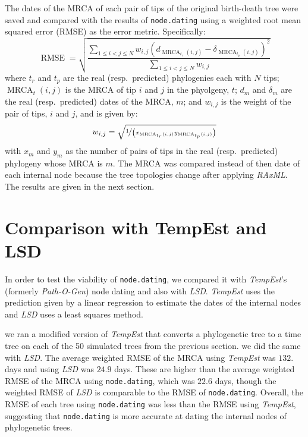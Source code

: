 \documentclass[12pt]{article}
\newcommand{\code}[1]{{\tt #1}}
\begin{document}
The dates of the MRCA of each pair of tips of the original birth-death tree were saved and compared with the results of \code{node.dating} using a weighted root mean squared error (RMSE) as the error metric.
Specifically:
\[\operatorname{RMSE} = \sqrt{\frac{\sum_{1 \leq i < j \leq N}w_{i,j}\left(d_{\operatorname{MRCA}_{t_r}(i,j)} - \delta_{\operatorname{MRCA}_{t_p}(i,j)}\right)^2}{\sum_{1 \leq i < j \leq N}w_{i,j}}}\]
where $t_r$ and $t_p$ are the real (resp.~predicted) phylogenies each with $N$ tips; $\operatorname{MRCA}_t(i, j)$ is the MRCA of tip $i$ and $j$ in the phyolgeny, $t$; $d_{m}$ and $\delta_m$ are the real (resp.~predicted) dates of the MRCA, $m$; and $w_{i, j}$ is the weight of the pair of tips, $i$ and $j$, and is given by:
\[w_{i, j} = \sqrt{\nicefrac{1}{\left(x_{\operatorname{MRCA}_{t_r}(i,j)}y_{\operatorname{MRCA}_{t_p}(i,j)}\right)}}\]
with $x_m$ and $y_m$ as the number of pairs of tips in the real (resp.~predicted) phylogeny whose MRCA is $m$.
The MRCA was compared instead of then date of each internal node because the tree topologies change after applying \emph{RAxML}. The results are given in the next section.

\section*{Comparison with TempEst and LSD} \label{sec:tempest}
In order to test the viability of \code{node.dating}, we compared it with \emph{TempEst}'s (formerly \emph{Path-O-Gen}) node dating and also with \emph{LSD}.
\emph{TempEst} uses the prediction given by a linear regression to estimate the dates of the internal nodes and \emph{LSD} uses a least squares method.

we ran a modified version of \emph{TempEst} that converts a phylogenetic tree to a time tree on each of the 50 simulated trees from the previous section.
we did the same with \emph{LSD}.
The average weighted RMSE of the MRCA using \emph{TempEst} was $132.$ days and using \emph{LSD} was $24.9$ days.
These are higher than the average weighted RMSE of the MRCA using \code{node.dating}, which was $22.6$ days, though the weighted RMSE of \emph{LSD} is comparable to the RMSE of \code{node.dating}.
Overall, the RMSE of each tree using \code{node.dating} was less than the RMSE using \emph{TempEst}, suggesting that \code{node.dating} is more accurate at dating the internal nodes of phylogenetic trees.
\end{document}
